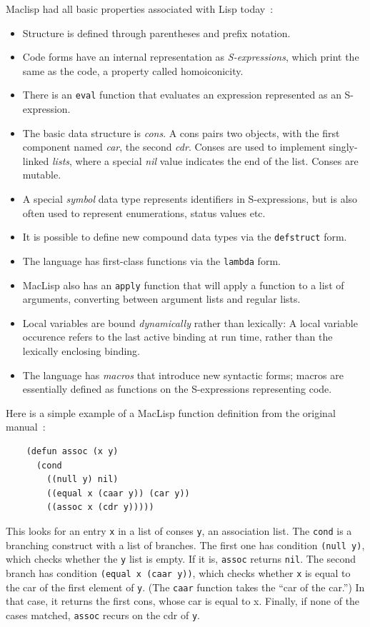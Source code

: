 \documentclass[format=acmsmall,screen]{acmart}
\begin{document}
\noindent
Maclisp had all basic properties associated with Lisp today~\cite{Moon1974}:
%
\begin{itemize}
\item Structure is defined through parentheses and prefix notation.
\item Code forms have an internal representation as
  \textit{S-expressions}, which print the same as the code, a property called
  homoiconicity.
\item There is an \texttt{eval} function that evaluates an expression
  represented as an S-expression.
\item The basic data structure is \textit{cons}.  A cons pairs two
  objects, with the first component named \textit{car}, the second
  \textit{cdr}.  Conses are used to implement singly-linked
  \textit{lists}, where a special \textit{nil} value indicates the end
  of the list.  Conses are mutable.
\item A special \textit{symbol} data type represents identifiers in
  S-expressions, but is also often used to represent enumerations,
  status values etc.
\item It is possible to define new compound data types via the
  \texttt{defstruct} form.
\item The language has first-class functions via the \texttt{lambda}
  form.
\item MacLisp also has an \texttt{apply} function that will apply a
  function to a list of arguments, converting between argument lists
  and regular lists.
\item Local variables are bound \textit{dynamically} rather than
  lexically: A local variable occurence refers to the last active
  binding at run time, rather than the lexically enclosing binding.
\item The language has \textit{macros} that introduce new syntactic
  forms; macros are essentially defined as functions on the S-expressions
  representing code.
\end{itemize}
%
Here is a simple example of a MacLisp function definition from the
original manual~\cite{Moon1974}:
%
\begin{verbatim}
    (defun assoc (x y)
      (cond
        ((null y) nil)
        ((equal x (caar y)) (car y))
        ((assoc x (cdr y)))))
\end{verbatim}
%
This looks for an entry \texttt{x} in a list of conses \texttt{y}, an
association list.  The \texttt{cond} is a branching construct with
a list of branches.  The first one has condition \texttt{(null y)}, which
checks whether the \texttt{y} list is empty.  If it is, \texttt{assoc}
returns \texttt{nil}.  The second branch has condition \texttt{(equal
  x (caar y))}, which checks whether \texttt{x} is equal to the car of the
first element of \texttt{y}.  (The \texttt{caar} function takes the
``car of the car.'')  In that case, it returns the first cons, whose
car is equal to x.  Finally, if none of the cases matched,
\texttt{assoc} recurs on the cdr of \texttt{y}.
\end{document}
